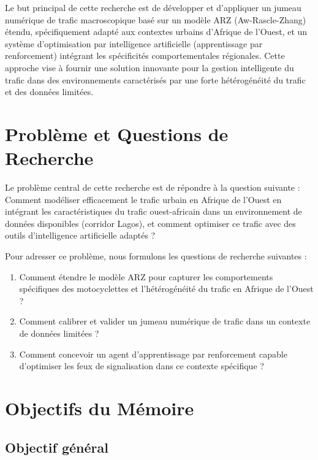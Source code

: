 Le but principal de cette recherche est de développer et d'appliquer un jumeau numérique de trafic macroscopique basé sur un modèle ARZ (Aw-Rascle-Zhang) étendu, spécifiquement adapté aux contextes urbains d'Afrique de l'Ouest, et un système d'optimisation par intelligence artificielle (apprentissage par renforcement) intégrant les spécificités comportementales régionales. Cette approche vise à fournir une solution innovante pour la gestion intelligente du trafic dans des environnements caractérisés par une forte hétérogénéité du trafic et des données limitées.

\section{Problème et Questions de Recherche}
\label{sec:probleme_questions}

Le problème central de cette recherche est de répondre à la question suivante : Comment modéliser efficacement le trafic urbain en Afrique de l'Ouest en intégrant les caractéristiques du trafic ouest-africain dans un environnement de données disponibles (corridor Lagos), et comment optimiser ce trafic avec des outils d'intelligence artificielle adaptés ?

Pour adresser ce problème, nous formulons les questions de recherche suivantes :
\begin{enumerate}
    \item Comment étendre le modèle ARZ pour capturer les comportements spécifiques des motocyclettes et l'hétérogénéité du trafic en Afrique de l'Ouest ?
    \item Comment calibrer et valider un jumeau numérique de trafic dans un contexte de données limitées ?
    \item Comment concevoir un agent d'apprentissage par renforcement capable d'optimiser les feux de signalisation dans ce contexte spécifique ?
\end{enumerate}

\section{Objectifs du Mémoire}
\label{sec:objectifs_memoire}

\subsection{Objectif général}
\label{subsec:objectif_general}

